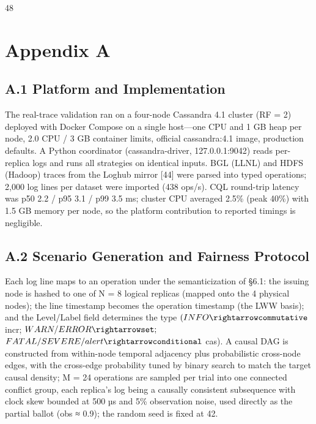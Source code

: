 \documentclass[10pt,twocolumn]{article}
\begin{document}
\begin{thebibliography}{48}
\appendix
\section*{Appendix A}
\subsection{A.1 Platform and Implementation}
The real-trace validation ran on a four-node Cassandra 4.1 cluster (RF = 2) deployed with Docker Compose on a single host—one CPU and 1 GB heap per node, 2.0 CPU / 3 GB container limits, official cassandra:4.1 image, production defaults. A Python coordinator (cassandra-driver, 127.0.0.1:9042) reads per-replica logs and runs all strategies on identical inputs. BGL (LLNL) and HDFS (Hadoop) traces from the Loghub mirror [44] were parsed into typed operations; 2,000 log lines per dataset were imported (438 ops/s). CQL round-trip latency was p50 2.2 / p95 3.1 / p99 3.5 ms; cluster CPU averaged 2.5\% (peak 40\%) with 1.5 GB memory per node, so the platform contribution to reported timings is negligible.

\subsection{A.2 Scenario Generation and Fairness Protocol}
Each log line maps to an operation under the semanticization of §6.1: the issuing node is hashed to one of N = 8 logical replicas (mapped onto the 4 physical nodes); the line timestamp becomes the operation timestamp (the LWW basis); and the Level/Label field determines the type $(INFO\rightarrowcommutative$ incr; $WARN/ERROR\rightarrowset;$ $FATAL/SEVERE/alert\rightarrowconditional$ cas). A causal DAG is constructed from within-node temporal adjacency plus probabilistic cross-node edges, with the cross-edge probability tuned by binary search to match the target causal density; M = 24 operations are sampled per trial into one connected conflict group, each replica's log being a causally consistent subsequence with clock skew bounded at 500 µs and 5\% observation noise, used directly as the partial ballot (obs ≈ 0.9); the random seed is fixed at 42.


\end{thebibliography}
\end{document}
